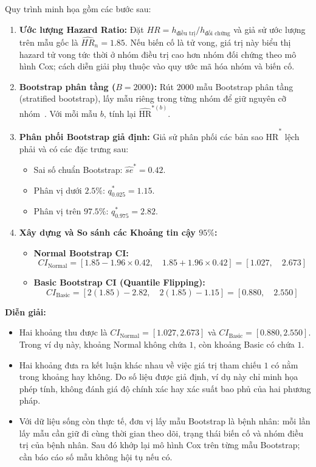 \documentclass[12pt,a4paper]{article}
\theoremstyle{definition}
\numberwithin{equation}{section}
\begin{document}
Quy trình minh họa gồm các bước sau:
\begin{enumerate}
	\item \textbf{Ước lượng Hazard Ratio:} Đặt $HR=h_{\text{điều trị}}/h_{\text{đối chứng}}$ và giả sử ước lượng trên mẫu gốc là $\widehat{HR}_n=1.85$. Nếu biến cố là tử vong, giá trị này biểu thị hazard tử vong tức thời ở nhóm điều trị cao hơn nhóm đối chứng theo mô hình Cox; cách diễn giải phụ thuộc vào quy ước mã hóa nhóm và biến cố.
	\item \textbf{Bootstrap phân tầng ($B=2000$):} Rút $2000$ mẫu Bootstrap phân tầng (stratified bootstrap), lấy mẫu riêng trong từng nhóm để giữ nguyên cỡ nhóm~\cite[tr. 86--91]{davison1997}. Với mỗi mẫu $b$, tính lại $\widehat{\text{HR}}^{*(b)}$.
	\item \textbf{Phân phối Bootstrap giả định:} Giả sử phân phối các bản sao $\widehat{\text{HR}}^*$ lệch phải và có các đặc trưng sau:
	\begin{itemize}
		\item Sai số chuẩn Bootstrap: $\widehat{se}^* = 0.42$.
		\item Phân vị dưới $2.5\%$: $q_{0.025}^* = 1.15$.
		\item Phân vị trên $97.5\%$: $q_{0.975}^* = 2.82$.
	\end{itemize}
	\item \textbf{Xây dựng và So sánh các Khoảng tin cậy $95\%$:}
	\begin{itemize}
		\item \textbf{Normal Bootstrap CI:}
		\begin{equation}
			CI_{\text{Normal}} = [1.85 - 1.96 \times 0.42, \quad 1.85 + 1.96 \times 0.42] = [1.027, \quad 2.673]
		\end{equation}
		\item \textbf{Basic Bootstrap CI (Quantile Flipping):}
		\begin{equation}
			CI_{\text{Basic}} = [2(1.85) - 2.82, \quad 2(1.85) - 1.15] = [0.880, \quad 2.550]
		\end{equation}
	\end{itemize}
\end{enumerate}

\textbf{Diễn giải:}
\begin{itemize}
	\item Hai khoảng thu được là
	$CI_{\text{Normal}}=[1.027,2.673]$ và
	$CI_{\text{Basic}}=[0.880,2.550]$. Trong ví dụ này, khoảng Normal
	không chứa $1$, còn khoảng Basic có chứa $1$.

	\item Hai khoảng đưa ra kết luận khác nhau về việc giá trị tham chiếu $1$
	có nằm trong khoảng hay không. Do số liệu được giả định, ví dụ này chỉ
	minh họa phép tính, không đánh giá độ chính xác hay xác suất bao phủ của
	hai phương pháp.

	\item Với dữ liệu sống còn thực tế, đơn vị lấy mẫu Bootstrap là bệnh nhân:
	mỗi lần lấy mẫu cần giữ đi cùng thời gian theo dõi, trạng thái biến cố
	và nhóm điều trị của bệnh nhân. Sau đó khớp lại mô hình Cox trên từng
	mẫu Bootstrap; cần báo cáo số mẫu không hội tụ nếu có.
\end{itemize}
\end{document}
